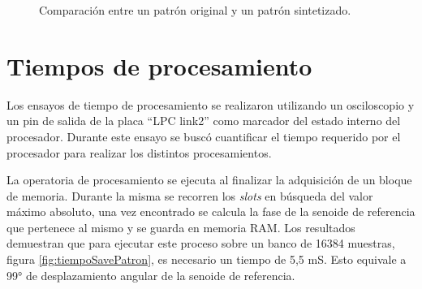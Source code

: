 \vspace{5mm}

\begin{figure}[htp] 
    \centering
    \hfill%
    \caption{Comparación entre un patrón original y un patrón sintetizado.}
\end{figure}


\section{Tiempos de procesamiento}
Los ensayos de tiempo de procesamiento se realizaron utilizando un osciloscopio y un pin de salida de la placa \enquote{LPC link2} como marcador del estado interno del procesador. Durante este ensayo se buscó cuantificar el tiempo requerido por el procesador para realizar los distintos procesamientos. 

La operatoria de procesamiento se ejecuta al finalizar la adquisición de un bloque de memoria. Durante la misma se recorren los \textit{slots} en búsqueda del valor máximo absoluto, una vez encontrado se calcula la fase de la senoide de referencia que pertenece al mismo y se guarda en memoria RAM. Los resultados demuestran que para ejecutar este proceso sobre un banco de 16384 muestras, figura \ref{fig:tiempoSavePatron}, es necesario un tiempo de 5,5 mS. Esto equivale a 99° de desplazamiento angular de la senoide de referencia. 

